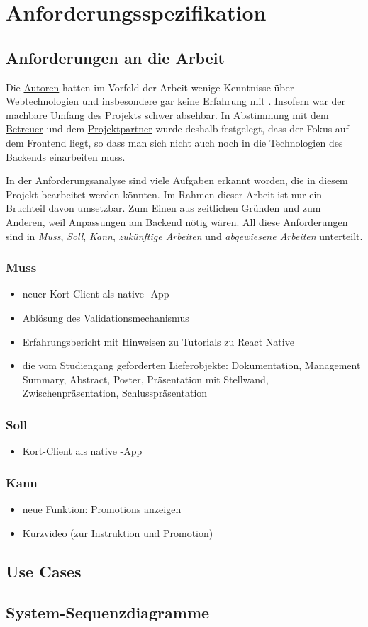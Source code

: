 \chapter{Anforderungsspezifikation}
\label{pd-anforderungsspezifikation}

\section{Anforderungen an die Arbeit} 
Die \hyperref[pm-team]{Autoren} hatten im Vorfeld der Arbeit wenige Kenntnisse über Webtechnologien und insbesondere gar keine Erfahrung mit .
Insofern war der machbare Umfang des Projekts schwer absehbar.
In Abstimmung mit dem \hyperref[pm-team]{Betreuer} und dem \hyperref[pm-team]{Projektpartner} wurde deshalb festgelegt, dass der Fokus auf dem Frontend liegt, so dass man sich nicht auch noch in die Technologien des Backends einarbeiten muss.

In der Anforderungsanalyse sind viele Aufgaben erkannt worden, die in diesem Projekt bearbeitet werden könnten. 
Im Rahmen dieser Arbeit ist nur ein Bruchteil davon umsetzbar.
Zum Einen aus zeitlichen Gründen und zum Anderen, weil Anpassungen am Backend nötig wären.
All diese Anforderungen sind in \emph{Muss}, \emph{Soll}, \emph{Kann}, \emph{zukünftige Arbeiten} und \emph{abgewiesene Arbeiten} unterteilt.

\subsection{Muss}
\begin{itemize}
	\item neuer Kort-Client als native -App
	\item Ablösung des Validationsmechanismus
	\item Erfahrungsbericht mit Hinweisen zu Tutorials zu React Native
	\item die vom Studiengang geforderten Lieferobjekte: Dokumentation, Management Summary, Abstract, Poster, Präsentation mit Stellwand, Zwischenpräsentation, Schlusspräsentation
\end{itemize}

\subsection{Soll}
\begin{itemize}
	\item Kort-Client als native -App
\end{itemize}

\subsection{Kann}
\begin{itemize}
	\item neue Funktion: Promotions anzeigen
	\item Kurzvideo (zur Instruktion und Promotion)
\end{itemize}


\section{Use Cases}


\section{System-Sequenzdiagramme}


